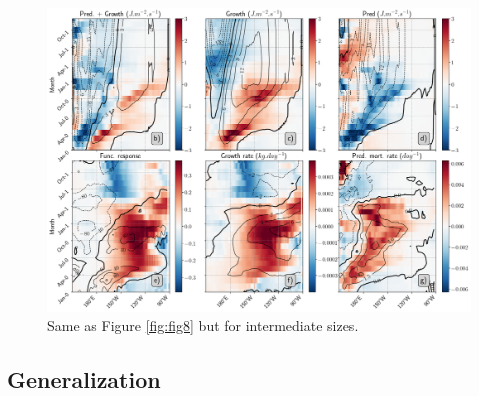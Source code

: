 \begin{figure}[h!tp]
	\centering
	\includegraphics[scale=0.4]{figs/fig9.png}	
	\caption{Same as Figure \ref{fig:fig8} but for intermediate sizes.}	
	\label{fig:fig9}
\end{figure}




\subsection{Generalization}

